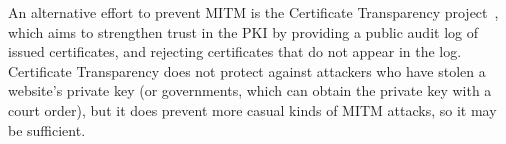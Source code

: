 An alternative effort to prevent MITM is the Certificate Transparency project~\cite{CertTrans},
which aims to strengthen trust in the PKI by providing a public audit log of issued certificates,
and rejecting certificates that do not appear in the log. Certificate Transparency does not protect
against attackers who have stolen a website's private key (or governments, which can obtain the
private key with a court order), but it does prevent more casual kinds of MITM attacks, so it may be
sufficient.
